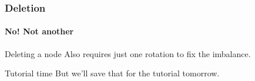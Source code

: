 \begin{frame}
	\frametitle{Deletion}
	\framesubtitle{No! Not another}
		\begin{block}{Deleting a node}
			Also requires just one rotation to fix the imbalance.
		\end{block}	
		\pause
			\begin{exampleblock}{Tutorial time}
			  But we'll save that for the tutorial tomorrow.	
			\end{exampleblock}	
\end{frame}
